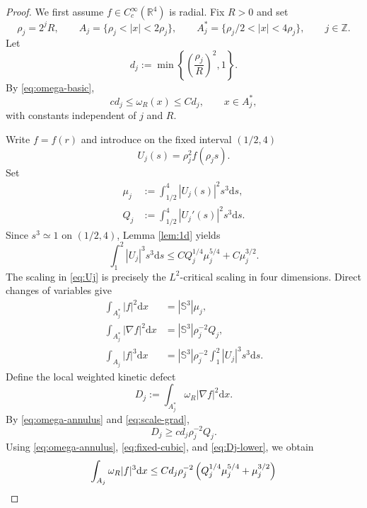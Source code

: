 \documentclass[10pt,a4paper]{amsart}
\numberwithin{equation}{section}
\newcommand{\R}{\mathbb{R}}
\newcommand{\dd}{\mathrm{d}x}
\newcommand{\dds}{\mathrm{d}s}
\begin{document}
\begin{proof}
We first assume $f\in C_c^\infty(\R^4)$ is radial.  Fix $R>0$ and set
\[
 \rho_j=2^jR, \qquad A_j=\{\rho_j<|x|<2\rho_j\},
 \qquad A_j^*=\{\rho_j/2<|x|<4\rho_j\}, \qquad j\in\mathbb Z.
\]
Let
\begin{equation*}
 d_j:=\min\left\{\left(\frac{\rho_j}{R}\right)^2,1\right\}.
\end{equation*}
By \eqref{eq:omega-basic},
\begin{equation}\label{eq:omega-annulus}
 c d_j\le \omega_R(x)\le C d_j,
 \qquad x\in A_j^*,
\end{equation}
with constants independent of $j$ and $R$.

Write $f=f(r)$ and introduce on the fixed interval $(1/2,4)$
\begin{equation}\label{eq:Uj}
 U_j(s)=\rho_j^2f(\rho_js).
\end{equation}
Set
\begin{align*}
 \mu_j&:=\int_{1/2}^4|U_j(s)|^2s^3\dds,\\
 Q_j&:=\int_{1/2}^4|U_j'(s)|^2s^3\dds.
\end{align*}
Since $s^3\simeq1$ on $(1/2,4)$, Lemma \ref{lem:1d} yields
\begin{equation}\label{eq:fixed-cubic}
 \int_1^2|U_j|^3s^3\dds
 \le C Q_j^{1/4}\mu_j^{5/4}+C\mu_j^{3/2}.
\end{equation}
The scaling in \eqref{eq:Uj} is precisely the $L^2$-critical scaling in four dimensions.  Direct changes of variables give
\begin{align}
 \int_{A_j^*}|f|^2\dd&=|\mathbb S^3|\mu_j,\nonumber\\
 \int_{A_j^*}|\nabla f|^2\dd&=|\mathbb S^3|\rho_j^{-2}Q_j,\label{eq:scale-grad}\\
 \int_{A_j}|f|^3\dd&=|\mathbb S^3|\rho_j^{-2}\int_1^2|U_j|^3s^3\dds.\nonumber
\end{align}
Define the local weighted kinetic defect
\begin{equation*}
 D_j:=\int_{A_j^*}\omega_R|\nabla f|^2\dd.
\end{equation*}
By \eqref{eq:omega-annulus} and \eqref{eq:scale-grad},
\begin{equation}\label{eq:Dj-lower}
 D_j\ge cd_j\rho_j^{-2}Q_j.
\end{equation}
Using \eqref{eq:omega-annulus}, \eqref{eq:fixed-cubic}, and \eqref{eq:Dj-lower}, we obtain
\begin{align}
 \int_{A_j}\omega_R|f|^3\dd
 &\le C d_j\rho_j^{-2} \left(Q_j^{1/4}\mu_j^{5/4}+\mu_j^{3/2}\right)\notag\\

\end{align}
\end{proof}
\end{document}

